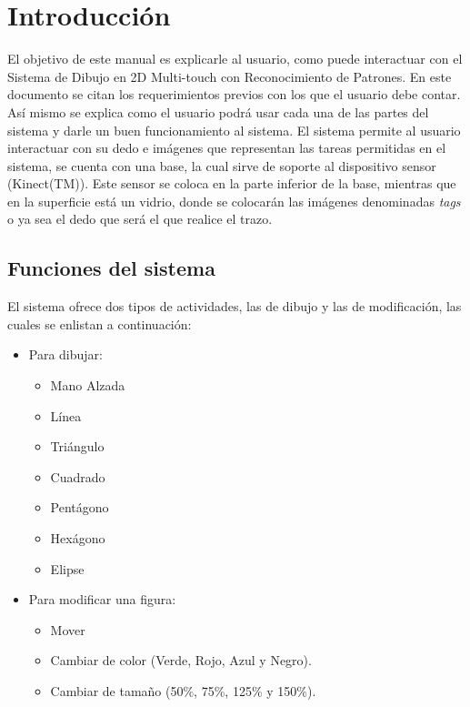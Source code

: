 \documentclass{book}
\begin{document}
\chapter{Introducción}

El objetivo de este manual es explicarle al usuario, como puede interactuar con el 
Sistema de Dibujo en 2D  Multi-touch con Reconocimiento de Patrones.
En este documento se citan los requerimientos previos con los que el usuario debe contar. 
Así mismo se explica como el usuario podrá usar cada una de las partes del sistema y darle un buen funcionamiento al sistema.
El sistema permite al usuario interactuar con su dedo e imágenes que representan las tareas permitidas en el sistema, 
se cuenta con una base, la cual sirve de soporte al dispositivo sensor (Kinect(TM)).
Este sensor se coloca en la parte inferior de la base, mientras que en la superficie está un vidrio, 
donde se colocarán las imágenes denominadas {\it tags} o ya sea el dedo que será el que realice el trazo.

\section{Funciones del sistema}

El sistema ofrece dos tipos de actividades, las de dibujo y las de modificación, 
las cuales se enlistan a continuación:

\begin{itemize}
\item Para dibujar:

 \begin{itemize}
  \item Mano Alzada
  \item Línea
  \item Triángulo
  \item Cuadrado
  \item Pentágono
  \item Hexágono
  \item Elipse
 \end{itemize}

\item Para modificar una figura:
  \begin{itemize}
    \item Mover
    \item Cambiar  de color (Verde, Rojo, Azul y Negro).
    \item Cambiar de tamaño (50\%, 75\%, 125\% y 150\%).
  \end{itemize}

\end{itemize}
\end{document}
